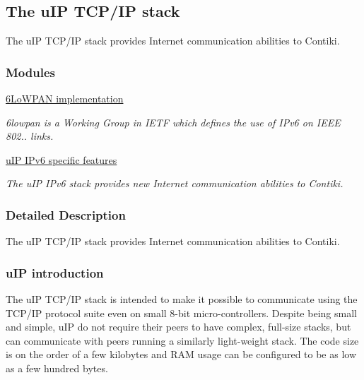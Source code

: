 \hypertarget{a00060}{\subsection{\-The u\-I\-P \-T\-C\-P/\-I\-P stack}
\label{a00060}
}


\-The u\-I\-P \-T\-C\-P/\-I\-P stack provides \-Internet communication abilities to \-Contiki.  


\subsubsection*{\-Modules}
\begin{DoxyCompactItemize}
\item 
\hyperlink{a00056}{6\-Lo\-W\-P\-A\-N implementation}
\begin{DoxyCompactList}\small\item\em 6lowpan is a \-Working \-Group in \-I\-E\-T\-F which defines the use of \-I\-Pv6 on \-I\-E\-E\-E 802.. links. \end{DoxyCompactList}\item 
\hyperlink{a00061}{u\-I\-P I\-Pv6 specific features}
\begin{DoxyCompactList}\small\item\em \-The u\-I\-P \-I\-Pv6 stack provides new \-Internet communication abilities to \-Contiki. \end{DoxyCompactList}\end{DoxyCompactItemize}


\subsubsection{\-Detailed \-Description}
\-The u\-I\-P \-T\-C\-P/\-I\-P stack provides \-Internet communication abilities to \-Contiki. \hypertarget{a00060_uip-introduction}{}\subsubsection{u\-I\-P introduction}\label{a00060_uip-introduction}
\-The u\-I\-P \-T\-C\-P/\-I\-P stack is intended to make it possible to communicate using the \-T\-C\-P/\-I\-P protocol suite even on small 8-\/bit micro-\/controllers. \-Despite being small and simple, u\-I\-P do not require their peers to have complex, full-\/size stacks, but can communicate with peers running a similarly light-\/weight stack. \-The code size is on the order of a few kilobytes and \-R\-A\-M usage can be configured to be as low as a few hundred bytes.

